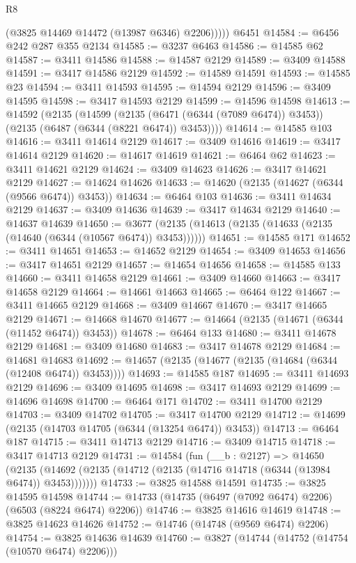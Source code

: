 \begin{lexlean}{R8}
\begin{coremodule}
            (@3825 @14469 @14472 (@13987 @6346) @2206)))))
    @6451
@14584 := @6456 @242 @287 @355 @2134
@14585 := @3237 @6463
@14586 := @14585 @62
@14587 := @3411 @14586
@14588 := @14587 @2129
@14589 := @3409 @14588
@14591 := @3417 @14586 @2129
@14592 := @14589 @14591
@14593 := @14585 @23
@14594 := @3411 @14593
@14595 := @14594 @2129
@14596 := @3409 @14595
@14598 := @3417 @14593 @2129
@14599 := @14596 @14598
@14613 := @14592
    (@2135
      (@14599
        (@2135 (@6471 (@6344 (@7089 @6474)) @3453))
        (@2135 (@6487 (@6344 (@8221 @6474)) @3453))))
@14614 := @14585 @103
@14616 := @3411 @14614 @2129
@14617 := @3409 @14616
@14619 := @3417 @14614 @2129
@14620 := @14617 @14619
@14621 := @6464 @62
@14623 := @3411 @14621 @2129
@14624 := @3409 @14623
@14626 := @3417 @14621 @2129
@14627 := @14624 @14626
@14633 := @14620 (@2135 (@14627 (@6344 (@9566 @6474)) @3453))
@14634 := @6464 @103
@14636 := @3411 @14634 @2129
@14637 := @3409 @14636
@14639 := @3417 @14634 @2129
@14640 := @14637 @14639
@14650 := @3677 (@2135 (@14613 (@2135 (@14633 (@2135 (@14640 (@6344 (@10567 @6474)) @3453))))))
@14651 := @14585 @171
@14652 := @3411 @14651
@14653 := @14652 @2129
@14654 := @3409 @14653
@14656 := @3417 @14651 @2129
@14657 := @14654 @14656
@14658 := @14585 @133
@14660 := @3411 @14658 @2129
@14661 := @3409 @14660
@14663 := @3417 @14658 @2129
@14664 := @14661 @14663
@14665 := @6464 @122
@14667 := @3411 @14665 @2129
@14668 := @3409 @14667
@14670 := @3417 @14665 @2129
@14671 := @14668 @14670
@14677 := @14664 (@2135 (@14671 (@6344 (@11452 @6474)) @3453))
@14678 := @6464 @133
@14680 := @3411 @14678 @2129
@14681 := @3409 @14680
@14683 := @3417 @14678 @2129
@14684 := @14681 @14683
@14692 := @14657 (@2135 (@14677 (@2135 (@14684 (@6344 (@12408 @6474)) @3453))))
@14693 := @14585 @187
@14695 := @3411 @14693 @2129
@14696 := @3409 @14695
@14698 := @3417 @14693 @2129
@14699 := @14696 @14698
@14700 := @6464 @171
@14702 := @3411 @14700 @2129
@14703 := @3409 @14702
@14705 := @3417 @14700 @2129
@14712 := @14699 (@2135 (@14703 @14705 (@6344 (@13254 @6474)) @3453))
@14713 := @6464 @187
@14715 := @3411 @14713 @2129
@14716 := @3409 @14715
@14718 := @3417 @14713 @2129
@14731 := @14584
    (fun (__b : @2127) =>
    @14650 (@2135 (@14692 (@2135 (@14712 (@2135 (@14716 @14718 (@6344 (@13984 @6474)) @3453)))))))
@14733 := @3825 @14588 @14591
@14735 := @3825 @14595 @14598
@14744 := @14733 (@14735 (@6497 (@7092 @6474) @2206) (@6503 (@8224 @6474) @2206))
@14746 := @3825 @14616 @14619
@14748 := @3825 @14623 @14626
@14752 := @14746 (@14748 (@9569 @6474) @2206)
@14754 := @3825 @14636 @14639
@14760 := @3827 (@14744 (@14752 (@14754 (@10570 @6474) @2206)))

\end{coremodule}
\end{lexlean}

